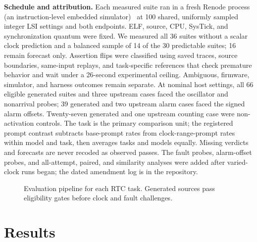 \documentclass[sigconf,nonacm]{acmart}
\begin{document}
\textbf{Schedule and attribution.} Each measured suite ran in a fresh Renode process (an instruction-level embedded simulator)~\cite{renodetime} at 100 shared, uniformly sampled integer LSI settings and both endpoints. ELF, source, CPU, SysTick, and synchronization quantum were fixed. We measured all 36 suites without a scalar clock prediction and a balanced sample of 14 of the 30 predictable suites; 16 remain forecast only. Assertion flips were classified using saved traces, source boundaries, same-input replays, and task-specific references that check premature behavior and wait under a 26-second experimental ceiling. Ambiguous, firmware, simulator, and harness outcomes remain separate. At nominal host settings, all 66 eligible generated suites and three upstream cases faced the oscillator and nonarrival probes; 39 generated and two upstream alarm cases faced the signed alarm offsets. Twenty-seven generated and one upstream counting case were non-activation controls. The task is the primary comparison unit; the registered prompt contrast subtracts base-prompt rates from clock-range-prompt rates within model and task, then averages tasks and models equally. Missing verdicts and forecasts are never recoded as observed passes. The fault probes, alarm-offset probes, and all-attempt, paired, and similarity analyses were added after varied-clock runs began; the dated amendment log is in the repository.

\begin{figure}[t]
\centering
{}
\caption{Evaluation pipeline for each RTC task. Generated sources pass eligibility gates before clock and fault challenges.}
\label{fig:pipeline}
\end{figure}

\section{Results}
\end{document}
